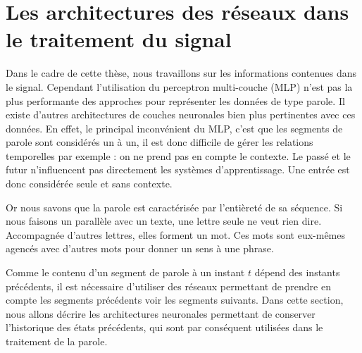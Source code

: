 %
%
%

\section{Les architectures des réseaux dans le traitement du signal}

Dans le cadre de cette thèse, nous travaillons sur les informations contenues dans le signal. %
Cependant l'utilisation du perceptron multi-couche (MLP) n'est pas la plus performante des approches pour représenter les données de type parole. Il existe d'autres architectures de couches neuronales bien plus pertinentes avec ces données. En effet, le principal inconvénient du MLP, c'est que les segments de parole sont considérés un à un, il est donc difficile de gérer les relations temporelles par exemple : on ne prend pas en compte le contexte. Le passé et le futur n'influencent pas directement les systèmes d'apprentissage. Une entrée est donc considérée seule et sans contexte.

Or nous savons que la parole est caractérisée par l'entièreté de sa séquence. Si nous faisons un parallèle avec un texte, une lettre seule ne veut rien dire. Accompagnée d'autres lettres, elles forment un mot. Ces mots sont eux-mêmes agencés avec d'autres mots pour donner un sens à une phrase.

Comme le contenu d'un segment de parole à un instant $t$ dépend des instants précédents, il est nécessaire d'utiliser des réseaux permettant de prendre en compte les segments précédents voir les segments suivants. Dans cette section, nous allons décrire les architectures neuronales permettant de conserver l'historique des états précédents, qui sont par conséquent utilisées dans le traitement de la parole.

